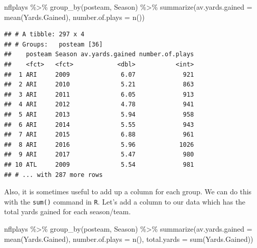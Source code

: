 \documentclass[
]{book}
\newenvironment{Shaded}{\begin{snugshade}}{\end{snugshade}}
\newcommand{\AttributeTok}[1]{\textcolor[rgb]{0.77,0.63,0.00}{#1}}
\newcommand{\FunctionTok}[1]{\textcolor[rgb]{0.00,0.00,0.00}{#1}}
\newcommand{\NormalTok}[1]{#1}
\newcommand{\SpecialCharTok}[1]{\textcolor[rgb]{0.00,0.00,0.00}{#1}}
\theoremstyle{definition}
\theoremstyle{definition}
\theoremstyle{definition}
\theoremstyle{definition}
\theoremstyle{remark}
\begin{document}
\begin{Shaded}
\begin{Highlighting}[]
\NormalTok{nflplays }\SpecialCharTok{\%\textgreater{}\%}
    \FunctionTok{group\_by}\NormalTok{(posteam, Season) }\SpecialCharTok{\%\textgreater{}\%}
    \FunctionTok{summarize}\NormalTok{(}\AttributeTok{av.yards.gained =} \FunctionTok{mean}\NormalTok{(Yards.Gained), }\AttributeTok{number.of.plays =} \FunctionTok{n}\NormalTok{())}
\end{Highlighting}
\end{Shaded}

\begin{verbatim}
## # A tibble: 297 x 4
## # Groups:   posteam [36]
##    posteam Season av.yards.gained number.of.plays
##    <fct>   <fct>            <dbl>           <int>
##  1 ARI     2009              6.07             921
##  2 ARI     2010              5.21             863
##  3 ARI     2011              6.05             913
##  4 ARI     2012              4.78             941
##  5 ARI     2013              5.94             958
##  6 ARI     2014              5.55             943
##  7 ARI     2015              6.88             961
##  8 ARI     2016              5.96            1026
##  9 ARI     2017              5.47             980
## 10 ATL     2009              5.54             981
## # ... with 287 more rows
\end{verbatim}

Also, it is sometimes useful to add up a column for each group. We can do this with the \texttt{sum()} command in \texttt{R}. Let's add a column to our data which has the total yards gained for each season/team.

\begin{Shaded}
\begin{Highlighting}[]
\NormalTok{nflplays }\SpecialCharTok{\%\textgreater{}\%}
    \FunctionTok{group\_by}\NormalTok{(posteam, Season) }\SpecialCharTok{\%\textgreater{}\%}
    \FunctionTok{summarize}\NormalTok{(}\AttributeTok{av.yards.gained =} \FunctionTok{mean}\NormalTok{(Yards.Gained), }\AttributeTok{number.of.plays =} \FunctionTok{n}\NormalTok{(), }\AttributeTok{total.yards =} \FunctionTok{sum}\NormalTok{(Yards.Gained))}
\end{Highlighting}
\end{Shaded}
\end{document}
